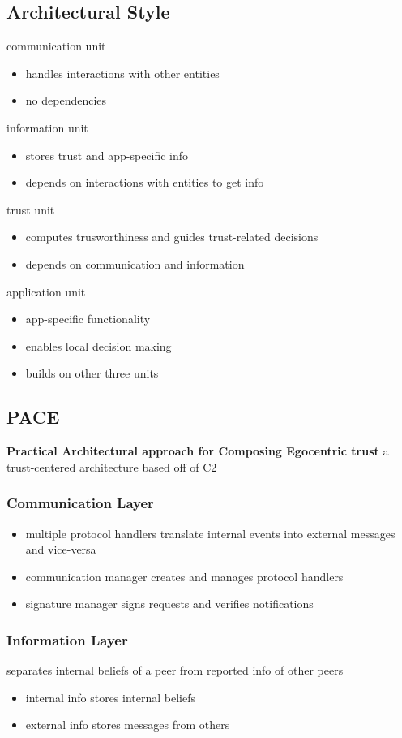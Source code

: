 \documentclass[]{article}
\theoremstyle{definition}
\begin{document}
	\subsection{Architectural Style}
	communication unit
	\begin{itemize}
		\item handles interactions with other entities
		\item no dependencies
	\end{itemize}
	information unit
	\begin{itemize}
		\item stores trust and app-specific info
		\item depends on interactions with entities to get info
	\end{itemize}
	trust unit
	\begin{itemize}
		\item computes trusworthiness and guides trust-related decisions
		\item depends on communication and information
	\end{itemize}
	application unit
	\begin{itemize}
		\item app-specific functionality
		\item enables local decision making
		\item builds on other three units
	\end{itemize}

	\subsection{PACE}
	\textbf{Practical Architectural approach for Composing Egocentric trust} a trust-centered architecture based off of C2
	\subsubsection{Communication Layer}
	\begin{itemize}
		\item multiple protocol handlers translate internal events into external messages and vice-versa
		\item communication manager creates and manages protocol handlers
		\item signature manager signs requests and verifies notifications
	\end{itemize}
	\subsubsection{Information Layer}
	separates internal beliefs of a peer from reported info of other peers
	\begin{itemize}
		\item internal info stores internal beliefs
		\item external info stores messages from others
	\end{itemize}
\end{document}
